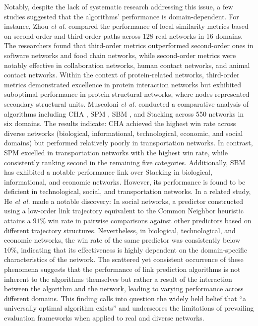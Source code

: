 \documentclass{article}
\begin{document}
Notably, despite the lack of systematic research addressing this issue, a few studies suggested that the algorithms’ performance is domain-dependent. For instance, Zhou \textit{et al.} \cite{zhou2021b} compared the performance of local similarity metrics based on second-order and third-order paths across 128 real networks in 16 domains. The researchers found that third-order metrics outperformed second-order ones in software networks and food chain networks, while second-order metrics were notably effective in collaboration networks, human contact networks, and animal contact networks. Within the context of protein-related networks, third-order metrics demonstrated excellence in protein interaction networks but exhibited suboptimal performance in protein structural networks, where nodes represented secondary structural units. Muscoloni \textit{et al.} \cite{muscoloni2023} conducted a comparative analysis of algorithms including CHA \cite{carlo2022}, SPM \cite{lv2015}, SBM \cite{roger2009}, and Stacking \cite{ghasemian2020} across 550 networks in six domains. The results indicate: CHA achieved the highest win rate across diverse networks (biological, informational, technological, economic, and social domains) but performed relatively poorly in transportation networks. In contrast, SPM excelled in transportation networks with the highest win rate, while consistently ranking second in the remaining five categories. Additionally, SBM has exhibited a notable performance link over Stacking in biological, informational, and economic networks. However, its performance is found to be deficient in technological, social, and transportation networks. In a related study, He \textit{et al.} \cite{he2024} made a notable discovery: In social networks, a predictor constructed using a low-order link trajectory equivalent to the Common Neighbor heuristic attains a $91\%$ win rate in pairwise comparisons against other predictors based on different trajectory structures. Nevertheless, in biological, technological, and economic networks, the win rate of the same predictor was consistently below $10\%$, indicating that its effectiveness is highly dependent on the domain-specific characteristics of the network. The scattered yet consistent occurrence of these phenomena suggests that the performance of link prediction algorithms is not inherent to the algorithms themselves but rather a result of the interaction between the algorithm and the network, leading to varying performance across different domains. This finding calls into question the widely held belief that ``a universally optimal algorithm exists'' and underscores the limitations of prevailing evaluation frameworks when applied to real and diverse networks.
	
\end{document}
